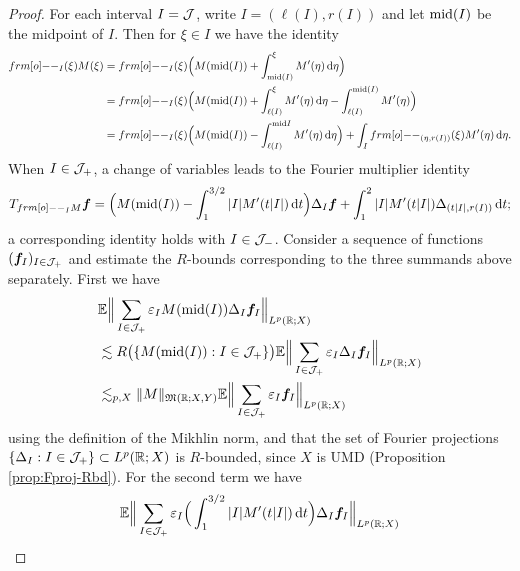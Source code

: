 \begin{proof}
  For each interval $I = \mathcal{J}$, write $I = (\ell(I), r(I))$ and let $\mathrm{mid}(I)$ be the midpoint of $I$.
  Then for $\xi \in I$ we have the identity
  \begin{equation*}
    \begin{aligned}
      \1_{I}(\xi)M(\xi)
      &= \1_{I}(\xi) \Big( M(\midp(I)) + \int_{\midp(I)}^{\xi} M'(\eta) \, \dd\eta \Big) \\
      &= \1_{I}(\xi) \Big( M(\midp(I)) + \int_{\ell(I)}^{\xi} M'(\eta) \, \dd\eta - \int_{\ell(I)}^{\midp(I)} M'(\eta) \Big) \\
      &= \1_{I}(\xi) \Big( M(\midp(I)) - \int_{\ell(I)}^{\midp{I}} M'(\eta) \, \dd\eta \Big) + \int_{I} \1_{(\eta,r(I))}(\xi) M'(\eta) \, \dd\eta.
    \end{aligned}
  \end{equation*}
  When $I \in \mathcal{J}_{+}$, a change of variables leads to the Fourier multiplier identity
  \begin{equation*}
    T_{\1_I M} \mb{f}
    = \Big( M(\midp(I)) - \int_{1}^{3/2} |I| M'(t|I|) \, \dd t \Big)\Delta_{I} \mb{f} + \int_{1}^{2} |I| M'(t|I|) \Delta_{(t|I|,r(I))} \, \dd t;
  \end{equation*}
  a corresponding identity holds with $I \in \mathcal{J}_{-}$.
  Consider a sequence of functions $(\bm{f}_{I})_{I \in \mathcal{J}_{+}}$ and estimate the $R$-bounds corresponding to the three summands above separately.
  First we have
  \begin{equation*}
    \begin{aligned}
      &\mathbb{E} \Big\| \sum_{I \in \mathcal{J}_{+}} \varepsilon_{I} M(\mathrm{mid}(I)) \Delta_{I} \bm{f}_{I} \Big\|_{L^p(\mathbb{R};X)} \\
      &\lesssim R\big( \{M(\mathrm{mid}(I)) : I \in \mathcal{J}_{+} \} \big) \mathbb{E} \Big\| \sum_{I \in \mathcal{J}_{+}} \varepsilon_{I}  \Delta_{I} \bm{f}_{I} \Big\|_{L^p(\mathbb{R};X)} \\
    &\lesssim_{p,X} \|M\|_{\mathfrak{M}(\mathbb{R};X,Y)} \mathbb{E} \Big\| \sum_{I \in \mathcal{J}_{+}} \varepsilon_{I} \bm{f}_{I} \Big\|_{L^p(\mathbb{R};X)} 
  \end{aligned}
\end{equation*}
using the definition of the Mikhlin norm, and that the set of Fourier projections $\{\Delta_{I} : I \in \mathcal{J}_{+}\} \subset L^p(\mathbb{R};X)$ is $R$-bounded, since $X$ is UMD (Proposition \ref{prop:Fproj-Rbd}).
For the second term we have
\begin{equation*}
  \begin{aligned}
    &\E \Big\| \sum_{I \in \mc{J}_{+}} \varepsilon_{I} \Big( \int_{1}^{3/2} |I|  M'(t|I|) \, \dd t \Big)\Delta_{I} \mb{f}_{I} \Big\|_{L^p(\R;X)} \\

\end{aligned}
\end{equation*}
\end{proof}
